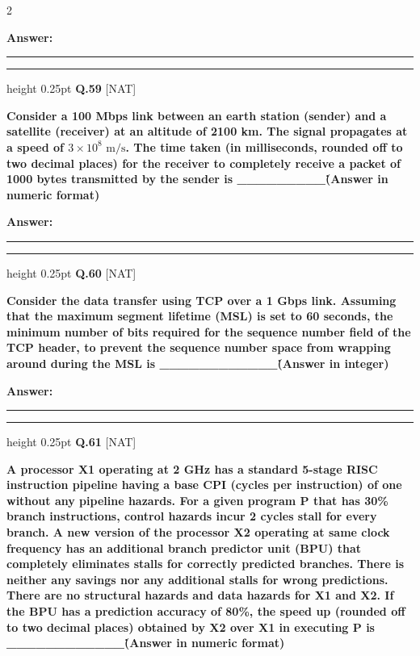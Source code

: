 \documentclass[a4paper,10pt,twoside]{article}
\begin{document}
\begin{multicols}{2}
\par\vspace{3pt}\noindent\textbf{Answer:} \rule{3.2cm}{0.4pt}
\par\vspace{6pt}\hrule height 0.25pt\vspace{6pt}
\noindent\textbf{Q.59} \hfill {\footnotesize\textsf{[NAT]}}
\par\vspace{2pt}
{\bfseries Consider a 100 Mbps link between an earth station (sender) and a satellite (receiver) at an altitude of 2100 km. The signal propagates at a speed of $3 \times 10^8\text{ m/s}$. The time taken (in milliseconds, rounded off to two decimal places) for the receiver to completely receive a packet of 1000 bytes transmitted by the sender is \_\_\_\_\_\_\_\_\_\. (Answer in numeric format) \par}
\par\vspace{3pt}\noindent\textbf{Answer:} \rule{3.2cm}{0.4pt}
\par\vspace{6pt}\hrule height 0.25pt\vspace{6pt}
\noindent\textbf{Q.60} \hfill {\footnotesize\textsf{[NAT]}}
\par\vspace{2pt}
{\bfseries Consider the data transfer using TCP over a 1 Gbps link. Assuming that the maximum segment lifetime (MSL) is set to 60 seconds, the minimum number of bits required for the sequence number field of the TCP header, to prevent the sequence number space from wrapping around during the MSL is \_\_\_\_\_\_\_\_\_\_\_\_\. (Answer in integer) \par}
\par\vspace{3pt}\noindent\textbf{Answer:} \rule{3.2cm}{0.4pt}
\par\vspace{6pt}\hrule height 0.25pt\vspace{6pt}
\noindent\textbf{Q.61} \hfill {\footnotesize\textsf{[NAT]}}
\par\vspace{2pt}
{\bfseries A processor X1 operating at 2 GHz has a standard 5-stage RISC instruction pipeline having a base CPI (cycles per instruction) of one without any pipeline hazards. For a given program P that has 30\% branch instructions, control hazards incur 2 cycles stall for every branch. A new version of the processor X2 operating at same clock frequency has an additional branch predictor unit (BPU) that completely eliminates stalls for correctly predicted branches. There is neither any savings nor any additional stalls for wrong predictions. There are no structural hazards and data hazards for X1 and X2. If the BPU has a prediction accuracy of 80\%, the speed up (rounded off to two decimal places) obtained by X2 over X1 in executing P is \_\_\_\_\_\_\_\_\_\_\_\_\. (Answer in numeric format) \par}

\end{multicols}
\end{document}
